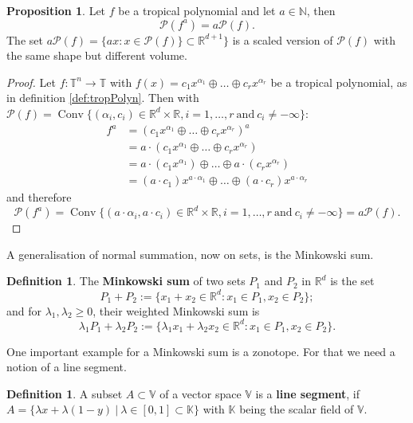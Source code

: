 \documentclass{article}
\theoremstyle{definition}
\newtheorem{definition}[theorem]{Definition}
\newtheorem{proposition}[theorem]{Proposition}
\DeclareMathOperator{\Conv}{Conv}
\begin{document}
\begin{proposition}\hspace{1sp}\cite[p.~4]{zhang2018tropical}
\label{prop:p_exp}
Let $f$ be a tropical polynomial and let $a \in \mathbb{N}$, then
$$ \mathcal{P}(f^{a}) = a \mathcal{P}(f).$$
The set $a \mathcal{P}(f) = \{ax : x \in \mathcal{P}(f) \} \subset \mathbb{R}^{d + 1}\}$ is a scaled version of $\mathcal{P}(f)$ with the same shape but different volume.
\end{proposition}
\begin{proof}
Let $f:\mathbb{T}^{n} \to \mathbb{T}$ with $f(x)=c_{1}x^{\alpha_1} \oplus \dots \oplus c_{r}x^{\alpha_r}$ be a tropical polynomial, as in definition \ref{def:tropPolyn}. Then with $\mathcal{P}(f) = \Conv\{(\alpha_{i}, c_{i}) \in \mathbb{R}^{d} \times \mathbb{R}, i= 1, \dots , r \ \text{and} \ c_{i} \neq - \infty \}$:
\begin{align*}
f^{a} &= (c_{1}x^{\alpha_{1}} \oplus \dots \oplus c_{r} x^{\alpha_{r}})^{a} \\
&= a \cdot (c_{1}x^{\alpha_{1}} \oplus \dots \oplus c_{r} x^{\alpha_{r}}) \\
&= a \cdot (c_{1}x^{\alpha_{1}}) \oplus \dots \oplus a \cdot (c_{r} x^{\alpha_{r}}) \\
&= (a \cdot c_{1})x^{a \cdot \alpha_{1}} \oplus \dots \oplus (a \cdot c_{r}) x^{a \cdot \alpha_{r}}
\end{align*}
and therefore
$$\mathcal{P}(f^{a}) = \Conv\{(a \cdot \alpha_{i}, a \cdot c_{i}) \in \mathbb{R}^{d} \times \mathbb{R}, i = 1, \dots, r \ \text{and} \ c_{i} \neq - \infty \} = a\mathcal{P}(f).$$
\end{proof}

A generalisation of normal summation, now on sets, is the Minkowski sum.

\begin{definition}\hspace{1sp}\cite[p.~4]{zhang2018tropical}
The \textbf{Minkowski sum} of two sets $P_1$ and $P_2$ in $\mathbb{R}^{d}$ is the set
$$ P_1 + P_2 := \{x_1 + x_2 \in \mathbb{R}^{d} : x_1 \in P_1 ,x_2 \in P_2 \};$$
and for $\lambda_1 , \lambda_2 \geq 0$, their weighted Minkowski sum is
$$ \lambda_1 P_1 + \lambda_2 P_2 := \{ \lambda_1 x_1 + \lambda_2 x_2 \in \mathbb{R}^{d} : x_1 \in P_1 , x_2 \in P_2 \}.$$
\end{definition}

One important example for a Minkowski sum is a zonotope. For that we need a notion of a line segment.
\begin{definition}
A subset $A \subset \mathbb{V}$ of a vector space $\mathbb{V}$ is a \textbf{line segment}, if $A=\{\lambda x + \lambda (1-y) \ | \ \lambda \in [0,1]\subset \mathbb{K}\}$ with $\mathbb{K}$ being the scalar field of $\mathbb{V}$.
\end{definition}
\end{document}
